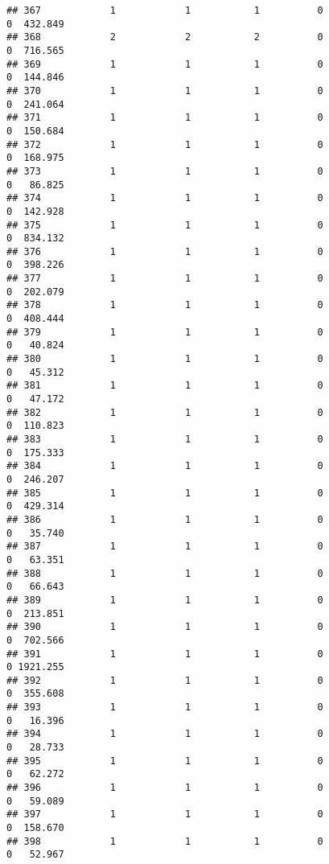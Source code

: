 \documentclass[
]{article}
\begin{document}
\begin{verbatim}
## 367            1            1           1          0                0  432.849
## 368            2            2           2          0                0  716.565
## 369            1            1           1          0                0  144.846
## 370            1            1           1          0                0  241.064
## 371            1            1           1          0                0  150.684
## 372            1            1           1          0                0  168.975
## 373            1            1           1          0                0   86.825
## 374            1            1           1          0                0  142.928
## 375            1            1           1          0                0  834.132
## 376            1            1           1          0                0  398.226
## 377            1            1           1          0                0  202.079
## 378            1            1           1          0                0  408.444
## 379            1            1           1          0                0   40.824
## 380            1            1           1          0                0   45.312
## 381            1            1           1          0                0   47.172
## 382            1            1           1          0                0  110.823
## 383            1            1           1          0                0  175.333
## 384            1            1           1          0                0  246.207
## 385            1            1           1          0                0  429.314
## 386            1            1           1          0                0   35.740
## 387            1            1           1          0                0   63.351
## 388            1            1           1          0                0   66.643
## 389            1            1           1          0                0  213.851
## 390            1            1           1          0                0  702.566
## 391            1            1           1          0                0 1921.255
## 392            1            1           1          0                0  355.608
## 393            1            1           1          0                0   16.396
## 394            1            1           1          0                0   28.733
## 395            1            1           1          0                0   62.272
## 396            1            1           1          0                0   59.089
## 397            1            1           1          0                0  158.670
## 398            1            1           1          0                0   52.967

\end{verbatim}
\end{document}
